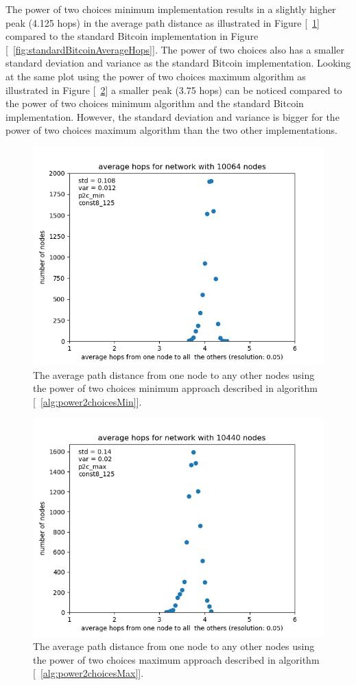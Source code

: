\documentclass[a4paper, oneside]{discothesis}
\begin{document}
The power of two choices minimum implementation results in a slightly higher peak (4.125 hops) in the average path distance as illustrated in Figure [~\ref{fig:p2cMinAverageHops}] compared to the standard Bitcoin implementation in Figure [~\ref{fig:standardBitcoinAverageHops}]. The power of two choices also has a smaller standard deviation and variance as the standard Bitcoin implementation.
Looking at the same plot using the power of two choices maximum algorithm as illustrated in Figure [~\ref{fig:p2cMaxAverageHops}] a smaller peak (3.75 hops) can be noticed compared to the power of two choices minimum algorithm and the standard Bitcoin implementation. However, the standard deviation and variance is bigger for the power of two choices maximum algorithm than the two other implementations.

\begin{figure}
    \centering
    \includegraphics[width=.8\columnwidth]{figures/power2choices/p2c-min/average-hops-for-network-with-10064-nodes.png}
    \caption{The average path distance from one node to any other nodes using the power of two choices minimum approach described in algorithm [~\ref{alg:power2choicesMin}].}
    \label{fig:p2cMinAverageHops}
\end{figure}

\begin{figure}
    \centering
    \includegraphics[width=.8\columnwidth]{figures/power2choices/p2c-max/average-hops-for-network-with-10440-nodes.png}
    \caption{The average path distance from one node to any other nodes using the power of two choices maximum approach described in algorithm [~\ref{alg:power2choicesMax}].}
    \label{fig:p2cMaxAverageHops}
\end{figure}
\end{document}
